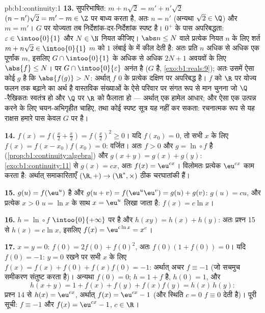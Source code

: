 \begin{solution}{pb:b1:continuity:1}
\textbf{13.} सुपरिभाषित: $m + n\sqrt2 = m' + n'\sqrt2$ $(n - n')\sqrt2 = m'
- m \in \Z$ पर बाध्य करता है, अतः $n = n'$ (अन्यथा $\sqrt2 \in \Q$) और $m =
m'$। $G$ पर योज्यता तब निर्देशांक-दर-निर्देशांक स्पष्ट है। $0^+$ के पास
अपरिबद्धता: $\varepsilon \in \intoo{0}{1}$ और $N \in \N$ नियत कीजिए। $\abs n
\leq N$ वाले प्रत्येक नियत $n$ के लिए शर्त $m + n\sqrt2 \in \intoo{0}{1}$
$m$ को $1$ लंबाई के  में कील देती है: अतः प्रति $n$ अधिक से अधिक एक
पूर्णांक $m$, इसलिए $G \cap \intoo{0}{1}$ के अधिक से अधिक $2N + 1$ अवयवों के
लिए $\abs{f} \leq N$। पर $G \cap \intoo{0}{\varepsilon}$ अनंत है ($G$ 
है, \cref{exo:b1:reals:9}); अतः उसमें ऐसा कोई $g$ है कि $\abs{f(g)} > N$:
अर्थात् $f$ $0$ के प्रत्येक दक्षिण  पर अपरिबद्ध है। $f$ को $\R$ पर
योज्य फलन तक बढ़ाने का अर्थ है वास्तविक संख्याओं के ऐसे परिवार पर संगत रूप
से मान चुनना जो $\Q$-रैखिकतः स्वतंत्र हो और $\Q$ पर $\R$ को फैलाता हो ---
अर्थात् एक हामेल आधार; और ऐसा एक उत्पन्न करने के लिए चयन-अभिगृहीत चाहिए, तथा
कोई स्पष्ट सूत्र यह नहीं कर सकता: रचनात्मक रूप से यह राक्षस हमारे पास केवल
$G$ पर है।

\textbf{14.} $f(x) = f(\frac x2 + \frac x2) = f(\frac x2)^2 \geq 0$। यदि
$f(x_0) = 0$, तो सभी $x$ के लिए $f(x) = f(x - x_0)f(x_0) = 0$: वर्जित। अतः
$f > 0$ और $g = \ln \circ f$  है (\cref{prop:b1:continuity:algebra}) और
$g(x + y) = g(x) + g(y)$: \cref{exo:b1:continuity:11} से $g(x) = cx$, अतः
$f(x) = \eu^{cx}$। विलोमतः प्रत्येक $\eu^{cx}$ काम करता है: अर्थात् 
समाकारिताएँ $(\R, +) \to (\R^*, \times)$ ठीक चरघातांकी हैं।

\textbf{15.} $g(u) = f(\eu^u)$  है और $g(u + v) = f(\eu^u \eu^v) = g(u)
+ g(v)$: $g(u) = cu$, और प्रत्येक $x > 0$ $u = \ln x$ के साथ $x = \eu^u$
लिखा जाता है: $f(x) = c\ln x$।

\textbf{16.} $h = \ln \circ f$ $\intoo{0}{+\infty}$ पर  है और $h(xy) =
h(x) + h(y)$: अतः प्रश्न 15 से $h(x) = c\ln x$, इसलिए $f(x) = \eu^{c\ln x} =
x^c$।

\textbf{17.} $x = y = 0$: $f(0) = 2f(0) + f(0)^2$, अतः $f(0)(1 + f(0)) = 0$।
यदि $f(0) = -1$: $y = 0$ रखने पर सभी $x$ के लिए $f(x) = f(x) + f(0) +
f(x)f(0) = -1$: अर्थात् अचर $f \equiv -1$ (जो सचमुच समीकरण संतुष्ट करता है)।
अन्यथा $f(0) = 0$; $h = 1 + f$  है, $h(0) = 1$, और
\[
h(x + y) = 1 + f(x) + f(y) + f(x)f(y) = h(x)\,h(y) :
\]
प्रश्न 14 से $h(x) = \eu^{cx}$, अर्थात् $f(x) = \eu^{cx} - 1$ (और स्थिति $c
= 0$ $f \equiv 0$ देती है)। पूरी सूची: $f \equiv -1$ और $f(x) = \eu^{cx} -
1$, $c \in \R$।


\end{solution}
